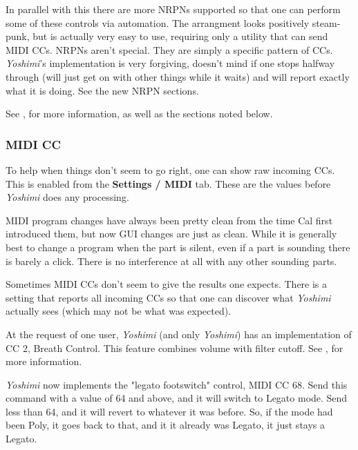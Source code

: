 \documentclass[
 11pt,
 twoside,
 a4paper,
 final                                 %
]{article}
\begin{document}
   In parallel with this there are more NRPNs supported so that one can perform
   some of these controls via automation. The arrangment looks positively
   steam-punk, but is actually very easy to use, requiring only a utility that
   can send MIDI CCs.  NRPNs aren't special. They are simply a specific pattern
   of CCs.  \textsl{Yoshimi}'s implementation is very forgiving, doesn't mind
   if one stops halfway through (will just get on with other things while it
   waits) and will report exactly what it is doing.  See the new NRPN
   sections.

   See , for more information, as well as the sections
   noted below.

\subsubsection{MIDI CC}
\label{subsubsec:new_features_midi_cc}

   To help when things don't seem to go right, one can show raw incoming
   CCs. This is enabled from the \textbf{Settings / MIDI} tab.
   These are the values before \textsl{Yoshimi} does any processing.

   MIDI program changes have always been pretty clean from the time Cal first
   introduced them, but now GUI changes are just as clean. While it is
   generally best to change a program when the part is silent, even if a part
   is sounding there is barely a click. There is no interference at all
   with any other sounding parts.

   Sometimes MIDI CCs don't seem to give the results one expects. There is
   a setting that reports all incoming CCs so that one can discover
   what \textsl{Yoshimi} actually sees (which may not be what was expected).

   At the request of one user, \textsl{Yoshimi} (and only \textsl{Yoshimi})
   has an implementation of CC 2, Breath Control.
   This feature combines volume with filter cutoff.
   See , for more information.

   \textsl{Yoshimi} now implements the "legato footswitch" control,
   MIDI CC 68.
   Send this command with a value of 64 and above, and it will    
   switch to Legato mode. Send less than 64, and it will revert to whatever it
   was before.  So, if the mode had been Poly, it goes back to that, and it it
   already was Legato, it just stays a Legato.                       
\end{document}
